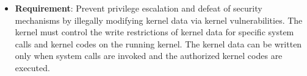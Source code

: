 \begin{itemize}%
\item {\bf Requirement}: Prevent privilege escalation and defeat of security mechanisms
 by illegally modifying kernel data via kernel vulnerabilities.
  The kernel must control the write restrictions of kernel data for specific
  system calls and kernel codes on the running kernel.
  The kernel data can be written only %
  when system calls are invoked and the authorized kernel codes are executed.




\end{itemize}



